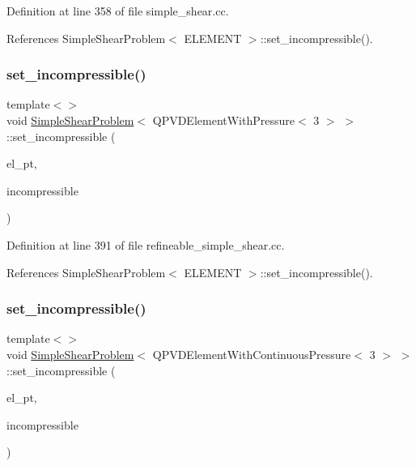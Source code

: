 Definition at line 358 of file simple\+\_\+shear.\+cc.



References Simple\+Shear\+Problem$<$ E\+L\+E\+M\+E\+N\+T $>$\+::set\+\_\+incompressible().

\mbox{\label{classSimpleShearProblem_a064e94ff77e20bc81cd4ddbec58f26aa}} 
\subsubsection{\texorpdfstring{set\+\_\+incompressible()}{set\_incompressible()}\hspace{0.1cm}{\footnotesize\ttfamily [6/7]}}
{\footnotesize\ttfamily template$<$$>$ \\
void \hyperlink{classSimpleShearProblem}{Simple\+Shear\+Problem}$<$ Q\+P\+V\+D\+Element\+With\+Pressure$<$ 3 $>$ $>$\+::set\+\_\+incompressible (\begin{DoxyParamCaption}\item[{Q\+P\+V\+D\+Element\+With\+Pressure$<$ 3 $>$ $\ast$}]{el\+\_\+pt,  }\item[{const bool \&}]{incompressible }\end{DoxyParamCaption})\hspace{0.3cm}{\ttfamily [private]}}



Definition at line 391 of file refineable\+\_\+simple\+\_\+shear.\+cc.



References Simple\+Shear\+Problem$<$ E\+L\+E\+M\+E\+N\+T $>$\+::set\+\_\+incompressible().

\mbox{\label{classSimpleShearProblem_a4f91c840813899e3977937e01e3bbb1e}} 
\subsubsection{\texorpdfstring{set\+\_\+incompressible()}{set\_incompressible()}\hspace{0.1cm}{\footnotesize\ttfamily [7/7]}}
{\footnotesize\ttfamily template$<$$>$ \\
void \hyperlink{classSimpleShearProblem}{Simple\+Shear\+Problem}$<$ Q\+P\+V\+D\+Element\+With\+Continuous\+Pressure$<$ 3 $>$ $>$\+::set\+\_\+incompressible (\begin{DoxyParamCaption}\item[{Q\+P\+V\+D\+Element\+With\+Continuous\+Pressure$<$ 3 $>$ $\ast$}]{el\+\_\+pt,  }\item[{const bool \&}]{incompressible }\end{DoxyParamCaption})\hspace{0.3cm}{\ttfamily [private]}}



